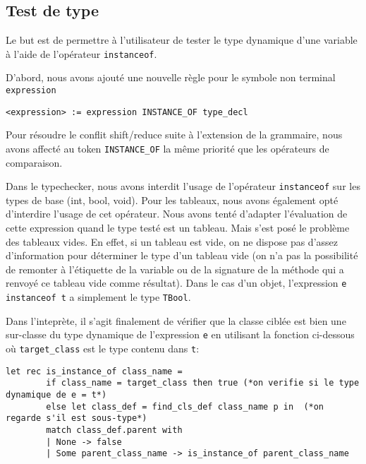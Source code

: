 \documentclass{article}
\begin{document}
\subsection{Test de type}
Le but est de permettre à l'utilisateur de tester le type dynamique d'une variable à l'aide 
de l'opérateur \texttt{instanceof}.

D'abord, nous avons ajouté une nouvelle règle pour le symbole non terminal \texttt{expression}
\begin{lstlisting}[style=mystyle]
    <expression> := expression INSTANCE_OF type_decl    
\end{lstlisting}

Pour résoudre le conflit shift/reduce suite à l'extension de la grammaire,
nous avons affecté au token \texttt{INSTANCE\_OF} la même priorité que les 
opérateurs de comparaison. 

Dans le typechecker, nous avons interdit l'usage de l'opérateur \texttt{instanceof} sur les types de base (int, bool, void). Pour les tableaux, nous avons également opté d'interdire l'usage de cet opérateur. Nous avons tenté d'adapter l'évaluation de cette expression quand le type testé est un tableau. Mais s'est posé le problème des tableaux vides. En effet, si un tableau est vide, on ne dispose pas d'assez d'information pour déterminer le type d'un tableau vide (on n'a pas la possibilité de remonter à l'étiquette de la variable ou de la signature de la méthode qui a renvoyé ce tableau vide comme résultat). Dans le cas d'un objet, l'expression \texttt{e instanceof t} a simplement le type \texttt{TBool}.

Dans l'inteprète, il s'agit finalement de vérifier que la classe ciblée est bien une sur-classe du type dynamique de l'expression \texttt{e} en utilisant la fonction ci-dessous où \texttt{target\_class} est le type contenu dans \texttt{t}:

\begin{lstlisting}[style=mystyle, language=caml]
    let rec is_instance_of class_name = 
        if class_name = target_class then true (*on verifie si le type dynamique de e = t*)
        else let class_def = find_cls_def class_name p in  (*on regarde s'il est sous-type*)
        match class_def.parent with
        | None -> false 
        | Some parent_class_name -> is_instance_of parent_class_name
\end{lstlisting}
\end{document}
